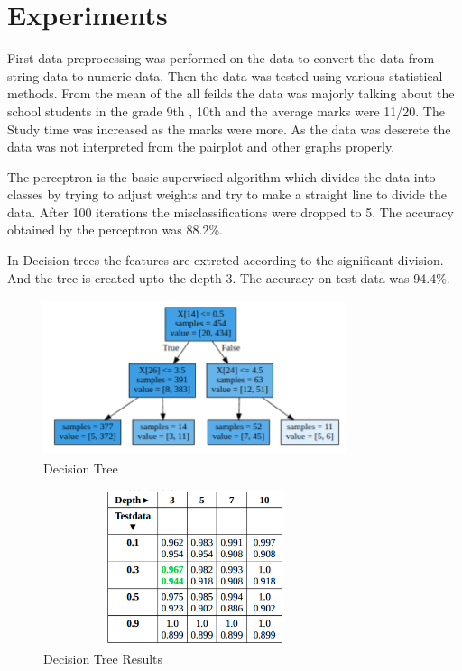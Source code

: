 \documentclass[conference,compsoc]{IEEEtran}
\begin{document}
\section{Experiments}
First data preprocessing was performed on the data to convert the data from string data to numeric data. Then the data was tested using various statistical methods. From the mean of the all feilds the data was majorly talking about the school students in the grade 9th , 10th and the average marks were 11/20. The Study time was increased as the marks were more. As the data was descrete the data was not interpreted from the pairplot and other graphs properly. 

The perceptron is the basic superwised algorithm which divides the data into classes by trying to adjust weights and try to make a straight line to divide the data. After 100 iterations the misclassifications were dropped to 5. The accuracy obtained by the perceptron was 88.2\%.

In Decision trees the features are extrcted according to the significant division. And the tree is created upto the depth 3.  The accuracy on test data was 94.4\%. 
\begin{figure}
	\centering
		\includegraphics[width=3.5in,height=1.8in]{DT_IMG.png}
	\caption{Decision Tree}
	\label{fig_1}
	
\end{figure}

\begin{figure}
	\centering
	\includegraphics[width=3.5in,height=1.8in]{DT.png}
	\caption{Decision Tree Results}
	\label{fig_2}
\end{figure}
\end{document}
